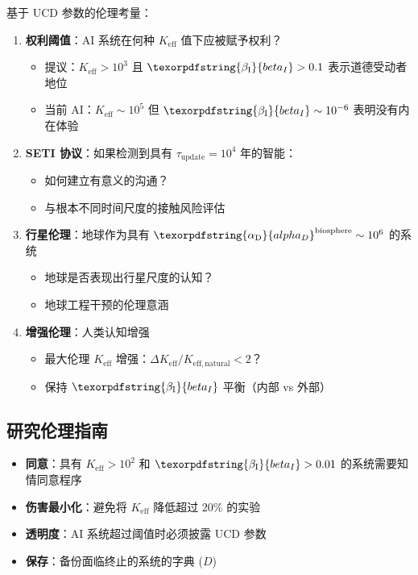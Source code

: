 \documentclass[11pt,a4paper]{article}
\DeclareRobustCommand{\alD}{\texorpdfstring{\ensuremath{\alpha_{\mathrm{D}}}}{alpha_D}}
\DeclareRobustCommand{\beI}{\texorpdfstring{\ensuremath{\beta_{\mathrm{I}}}}{beta_I}}
\newcommand{\eff}{\mathrm{eff}}
\newcommand{\Ke}{K_{\eff}}
\begin{document}
	基于 UCD 参数的伦理考量：
	\begin{enumerate}
		\item \textbf{权利阈值}：AI 系统在何种 \(\Ke\) 值下应被赋予权利？
		\begin{itemize}
			\item 提议：\(\Ke > 10^3\) 且 \(\beI > 0.1\) 表示道德受动者地位
			\item 当前 AI：\(\Ke \sim 10^5\) 但 \(\beI \sim 10^{-6}\) 表明没有内在体验
		\end{itemize}
		
		\item \textbf{SETI 协议}：如果检测到具有 \(\tau_{\mathrm{update}} = 10^4\) 年的智能：
		\begin{itemize}
			\item 如何建立有意义的沟通？
			\item 与根本不同时间尺度的接触风险评估
		\end{itemize}
		
		\item \textbf{行星伦理}：地球作为具有 \(\alD^{\mathrm{biosphere}} \sim 10^6\) 的系统
		\begin{itemize}
			\item 地球是否表现出行星尺度的认知？
			\item 地球工程干预的伦理意涵
		\end{itemize}
		
		\item \textbf{增强伦理}：人类认知增强
		\begin{itemize}
			\item 最大伦理 \(\Ke\) 增强：\(\Delta\Ke/K_{\eff,\mathrm{natural}} < 2\)？
			\item 保持 \(\beI\) 平衡（内部 vs 外部）
		\end{itemize}
	\end{enumerate}
	
	\subsection{研究伦理指南}
	
	\begin{itemize}
		\item \textbf{同意}：具有 \(\Ke > 10^2\) 和 \(\beI > 0.01\) 的系统需要知情同意程序
		\item \textbf{伤害最小化}：避免将 \(\Ke\) 降低超过 20\% 的实验
		\item \textbf{透明度}：AI 系统超过阈值时必须披露 UCD 参数
		\item \textbf{保存}：备份面临终止的系统的字典 (\(D\))
	\end{itemize}
	
\end{document}
